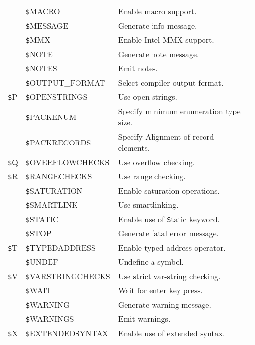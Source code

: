 \documentclass{article}
\newcommand{\var}[1]{{\texttt #1}}
\begin{document}
\begin{table}
\begin{tabularx}{\textwidth}{llX}
& \var{\$MACRO} & Enable macro support. \\
& \var{\$MESSAGE} & Generate info message. \\
& \var{\$MMX} & Enable Intel MMX support. \\
& \var{\$NOTE} & Generate note message. \\
& \var{\$NOTES} & Emit notes. \\
& \var{\$OUTPUT\_FORMAT} & Select compiler output format. \\
\var{\$P} & \var{\$OPENSTRINGS} & Use open strings. \\
& \var{\$PACKENUM} & Specify minimum enumeration type size. \\
& \var{\$PACKRECORDS} & Specify Alignment of record elements. \\
\var{\$Q} & \var{\$OVERFLOWCHECKS}& Use overflow checking. \\
\var{\$R} & \var{\$RANGECHECKS} & Use range checking. \\
& \var{\$SATURATION} & Enable saturation operations. \\
& \var{\$SMARTLINK} & Use smartlinking. \\
& \var{\$STATIC} & Enable use of \var{Static} keyword. \\
& \var{\$STOP} & Generate fatal error message. \\
\var{\$T} & \var{\$TYPEDADDRESS} & Enable typed address operator. \\
& \var{\$UNDEF} & Undefine a symbol. \\
\var{\$V} & \var{\$VARSTRINGCHECKS} & Use strict var-string checking. \\
& \var{\$WAIT} & Wait for enter key press. \\
& \var{\$WARNING} & Generate warning message. \\
& \var{\$WARNINGS} & Emit warnings. \\
\var{\$X} & \var{\$EXTENDEDSYNTAX} & Enable use of extended syntax. \\ \hline
\end{tabularx}
\end{table}
\end{document}
